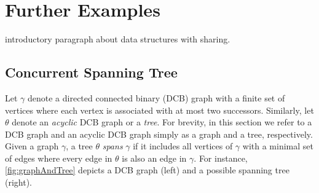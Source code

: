 \section{Further Examples}\label{sec:examples}
\todo introductory paragraph about data structures with sharing.\\
\subsection{Concurrent Spanning Tree}
Let $\gamma$ denote a directed connected binary (DCB) graph with a finite set of vertices where each vertex is associated with at most two successors. Similarly, let $\theta$ denote an \emph{acyclic} DCB graph or a \emph{tree}. For brevity, in this section we refer to a DCB graph and an acyclic DCB graph simply as a graph and a tree, respectively. Given a graph $\gamma$, a tree $\theta$ \emph{spans} $\gamma$ if it includes all vertices of $\gamma$ with a minimal set of edges where every edge in $\theta$ is also an edge in $\gamma$. 
For instance, \fig\ref{fig:graphAndTree} depicts a DCB graph (left) and a possible spanning tree (right).
